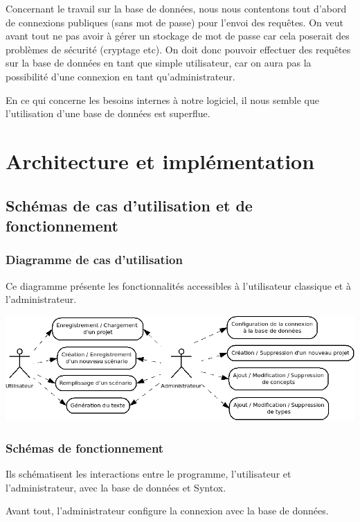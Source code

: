 \documentclass[12pt]{report}
\begin{document}
Concernant le travail sur la base de données, nous nous contentons tout
d'abord de connexions publiques (sans mot de passe) pour l'envoi des
requêtes. On veut avant tout ne pas avoir à gérer un stockage de mot de
passe car cela poserait des problèmes de sécurité (cryptage etc).
On doit donc pouvoir effectuer des requêtes sur la base de données en
tant que simple utilisateur, car on aura pas la possibilité d'une
connexion en tant qu'administrateur.

En ce qui concerne les besoins internes à notre logiciel, il nous semble
que l'utilisation d'une base de données est superflue.  


\chapter{Architecture et implémentation}

\section{Schémas de cas d'utilisation et de fonctionnement}




\subsection{Diagramme de cas d'utilisation}

	Ce diagramme présente les fonctionnalités accessibles à l'utilisateur classique et à l'administrateur. \bigskip

	\includegraphics[scale=0.5]{cas_utilisation.png}

\subsection{Schémas de fonctionnement}

Ils schématisent les interactions entre le programme, l'utilisateur et l'administrateur, avec la base de données et Syntox.


Avant tout, l'administrateur configure la connexion avec la base de données.
\end{document}

